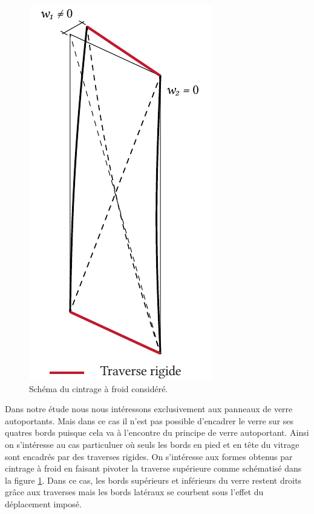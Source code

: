 \documentclass[11pt,titlepage]{article}
\begin{document}
\begin{figure}
    \vspace{-10pt}
    \centering
    \includegraphics[width=0.7\linewidth]{img/cintrage_froid/def.pdf}
       \caption{Schéma du cintrage à froid considéré.}
   \label{fig:forme_cintr}
   \end{figure}

Dans notre étude nous nous intéressons exclusivement aux panneaux de verre autoportants. Mais dans ce cas il n'est pas possible d'encadrer le verre sur ses quatres bords puisque cela va à l'encontre du principe de verre autoportant. Ainsi on s'intéresse au cas particuluer où seuls les bords en pied et en tête du vitrage sont encadrés par des traverses rigides. On s'intéresse aux formes obtenus par cintrage à froid en faisant pivoter la traverse supérieure comme schématisé dans la figure \ref{fig:forme_cintr}. Dans ce cas, les bords supérieurs et inférieurs du verre restent droits grâce aux traverses mais les bords latéraux se courbent sous l'effet du déplacement imposé. 
\end{document}
